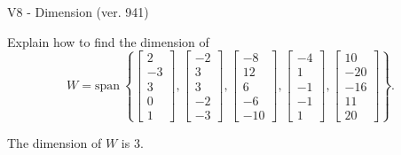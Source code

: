\begin{exercise}
  \begin{exerciseTitle}V8 - Dimension (ver. 941)\end{exerciseTitle}
  \begin{exerciseStatement}
    Explain how to find the dimension of 
\[W=\mathrm{span}\ \left\{\left[\begin{array}{r}
2 \\
-3 \\
3 \\
0 \\
1
\end{array}\right] , \left[\begin{array}{r}
-2 \\
3 \\
3 \\
-2 \\
-3
\end{array}\right] , \left[\begin{array}{r}
-8 \\
12 \\
6 \\
-6 \\
-10
\end{array}\right] , \left[\begin{array}{r}
-4 \\
1 \\
-1 \\
-1 \\
1
\end{array}\right] , \left[\begin{array}{r}
10 \\
-20 \\
-16 \\
11 \\
20
\end{array}\right]\right\}.\]



  \end{exerciseStatement}
  \begin{exerciseAnswer}
   The dimension of \(W\) is  \(3\).
  


  \end{exerciseAnswer}
\end{exercise}